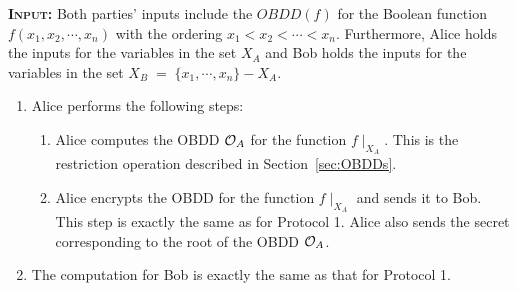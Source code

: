 \textsc{\bf Input:} Both parties' inputs include the $OBDD(f)$ for the Boolean function
$f(x_1,x_2,\cdots,x_n)$ with the ordering $x_1 < x_2 < \cdots < x_n$.
Furthermore, Alice holds the inputs for the variables in the set $X_A$ and
Bob holds the inputs for the variables in the set $X_B \; = \; \{ x_1,\cdots,x_n \} - X_A$.
\vspace{1ex}
\begin{enumerate}
\item Alice performs the following steps:
\begin{enumerate}
\item Alice computes the OBDD ${\cal O}_A$ for the function $f \mid_{X_A}$. This is the restriction
operation described in Section~\ref{sec:OBDDs}.

\item Alice encrypts the OBDD for the function $f \mid_{X_A}$ and sends it to Bob. This
step is exactly the same as for Protocol 1.  Alice also sends
the secret corresponding to the root of the OBDD ${\cal O}_A$. 


\end{enumerate}

\item The computation for Bob is exactly the same as that for Protocol 1. 

\end{enumerate}


